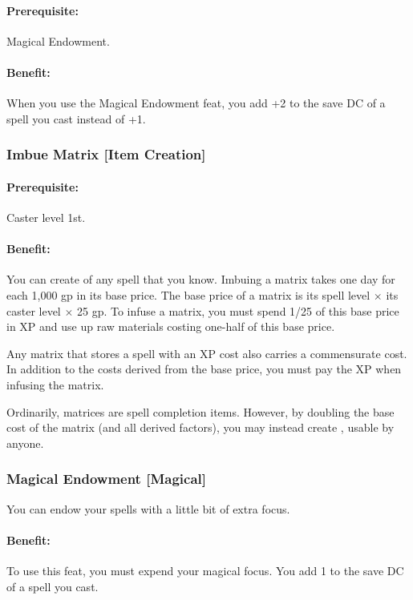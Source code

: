 \paragraph{Prerequisite:} Magical Endowment.

\paragraph{Benefit:} When you use the Magical Endowment feat, you add +2 to the save DC of a spell you cast instead of +1.
\subsubsection[Imbue Matrix]{Imbue Matrix [Item Creation]}
\label{Feat:ImbueMatrix}
\paragraph{Prerequisite:}
Caster level 1st.

\paragraph{Benefit:}
You can create  of any spell that you know. 
Imbuing a matrix takes one day for each 1,000 gp in its base price. 
The base price of a matrix is its spell level $\times$ its caster level $\times$ 25 gp.
To infuse a matrix, you must spend 1/25 of this base price in XP and use up raw materials costing one-half of this base price.

Any matrix that stores a spell with an XP cost also carries a commensurate cost. 
In addition to the costs derived from the base price, you must pay the XP when infusing the matrix.

Ordinarily, matrices are spell completion items. 
However, by doubling the base cost of the matrix (and all derived factors), you may instead create , usable by anyone.
\subsubsection[Magical Endowment]{Magical Endowment [Magical]}
\label{Feat:MagicalEndowment}
You can endow your spells with a little bit of extra focus.

\paragraph{Benefit:} To use this feat, you must expend your magical focus. You add 1 to the save DC of a spell you cast.


